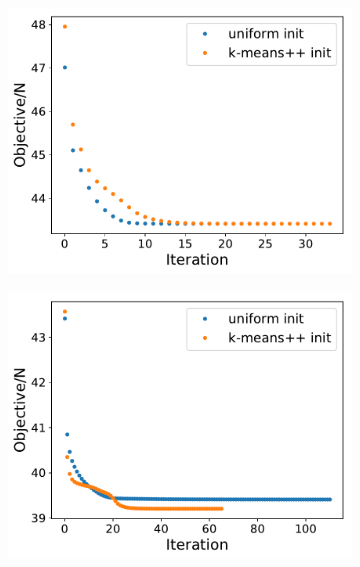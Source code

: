 \documentclass[11pt,letterpaper]{article}
\theoremstyle{definition}
\theoremstyle{plain}
\numberwithin{equation}{section}
\numberwithin{figure}{section}
\begin{document}
\begin{enumerate}
\begin{enumerate}
		\begin{figure}[H]
		\centering
			\begin{subfigure}[t]{.32\textwidth}
				\centering
				\includegraphics[width=\textwidth]{figures/5-objective.pdf}
			\end{subfigure}
			\begin{subfigure}[t]{.32\textwidth}
				\centering
				\includegraphics[width=\textwidth]{figures/10-objective.pdf}
			\end{subfigure}
			\begin{subfigure}[t]{.32\textwidth}
				\centering

\end{subfigure}
\end{figure}
\end{enumerate}
\end{enumerate}
\end{document}
